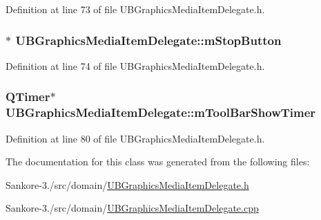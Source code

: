 Definition at line 73 of file U\-B\-Graphics\-Media\-Item\-Delegate.\-h.

\hypertarget{class_u_b_graphics_media_item_delegate_a1e4e109e8f668e66fc0ebfcb22fd024d}{
\subsubsection[{m\-Stop\-Button}]{$\ast$ U\-B\-Graphics\-Media\-Item\-Delegate\-::m\-Stop\-Button\hspace{0.3cm}{\ttfamily [protected]}}}\label{df/dfb/class_u_b_graphics_media_item_delegate_a1e4e109e8f668e66fc0ebfcb22fd024d}


Definition at line 74 of file U\-B\-Graphics\-Media\-Item\-Delegate.\-h.

\hypertarget{class_u_b_graphics_media_item_delegate_a3f7c09c6bfaeb788b1b85c0225c78f8d}{
\subsubsection[{m\-Tool\-Bar\-Show\-Timer}]{\setlength{\rightskip}{0pt plus 5cm}Q\-Timer$\ast$ U\-B\-Graphics\-Media\-Item\-Delegate\-::m\-Tool\-Bar\-Show\-Timer\hspace{0.3cm}{\ttfamily [protected]}}}\label{df/dfb/class_u_b_graphics_media_item_delegate_a3f7c09c6bfaeb788b1b85c0225c78f8d}


Definition at line 80 of file U\-B\-Graphics\-Media\-Item\-Delegate.\-h.



The documentation for this class was generated from the following files\-:\begin{DoxyCompactItemize}
\item 
Sankore-\/3./src/domain/\hyperlink{_u_b_graphics_media_item_delegate_8h}{U\-B\-Graphics\-Media\-Item\-Delegate.\-h}\item 
Sankore-\/3./src/domain/\hyperlink{_u_b_graphics_media_item_delegate_8cpp}{U\-B\-Graphics\-Media\-Item\-Delegate.\-cpp}\end{DoxyCompactItemize}
